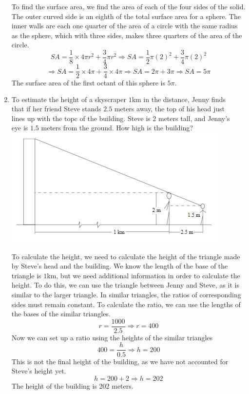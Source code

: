 \documentclass{article}
\begin{document}
\begin{enumerate}
To find the surface area, we find the area of each of the four sides of the solid.
The outer curved side is an eighth of the total surface area for a sphere.
The inner walls are each one quarter of the area of a circle with the same radius as the sphere,
which with three sides, makes three quarters of the area of the circle.
\[SA = \frac{1}{8}\times 4\pi r^{2} + \frac{3}{4}\pi r^2
    \Longrightarrow SA = \frac{1}{2}\pi {(2)}^{2} + \frac{3}{4}\pi {(2)}^{2}\]
\[\Longrightarrow SA = \frac{1}{2}\times 4\pi + \frac{3}{4}\times 4\pi
    \Longrightarrow SA = 2\pi + 3\pi \Longrightarrow SA = 5\pi\]
The surface area of the first octant of this sphere is $5\pi$.

\pagebreak
\item To estimate the height of a skyscraper $1$km in the distance, Jenny finds\\
that if her friend Steve stands $2.5$ meters away, the top of his head just\\
lines up with the topc of the building. Steve is $2$ meters tall, and Jenny's\\
eye is $1.5$ meters from the ground. How high is the building?
\\\includegraphics[scale = 0.95]{Images/Geo3.png}

To calculate the height, we need to calculate the height of the triangle made by Steve's
head and the building. We know the length of the base of the triangle is $1$km, but
we need additional information in order to calculate the height. To do this, we can use
the triangle between Jenny and Steve, as it is similar to the larger triangle. In similar
triangles, the ratios of corresponding sides must remain constant. To calculate the ratio,
we can use the lengths of the bases of the similar triangles.
\[r = \frac{1000}{2.5} \Longrightarrow r = 400\]
Now we can set up a ratio using the heights of the similar triangles
\[400 = \frac{h}{0.5} \Longrightarrow h = 200\]
This is not the final height of the building, as we have not accounted for Steve's height yet.
\[h = 200 + 2 \Longrightarrow h = 202\]
The height of the building is 202 meters.
\end{enumerate}
\end{document}

